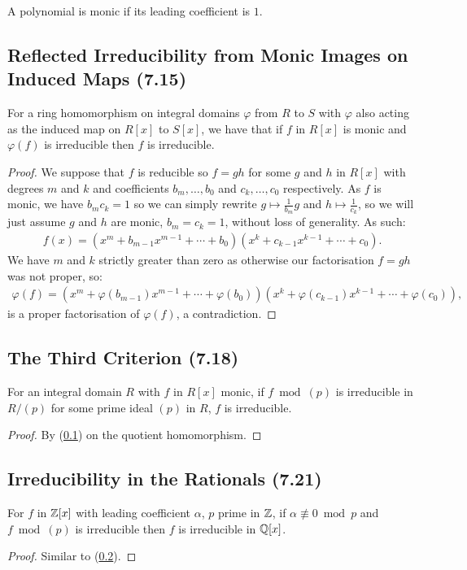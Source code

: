 A polynomial is monic if its leading coefficient is $1$.

\subsection{Reflected Irreducibility from Monic Images on Induced Maps (7.15)} \label{7.15}

For a ring homomorphism on integral domains $\varphi$ from $R$ to $S$ with $\varphi$ also
acting as the induced map on $R[x]$ to $S[x]$, we have that if $f$ in $R[x]$ is monic
and $\varphi(f)$ is irreducible then $f$ is irreducible.

\begin{proof}
    We suppose that $f$ is reducible so $f = gh$ for some $g$ and $h$ in $R[x]$ with
    degrees $m$ and $k$ and coefficients $b_m, \ldots, b_0$ and $c_k, \ldots, c_0$
    respectively. As $f$ is monic, we have $b_mc_k = 1$ so we can simply rewrite
    $g \mapsto \frac{1}{b_m}g$ and $h \mapsto \frac{1}{c_k}$, so we will just assume
    $g$ and $h$ are monic, $b_m = c_k = 1$, without loss of generality. As such:
    \begin{align*}
        f(x) = (x^m + b_{m - 1}x^{m - 1} + \cdots + b_0)
            (x^k + c_{k - 1}x^{k - 1} + \cdots + c_0).
    \end{align*} We have $m$ and $k$ strictly greater than zero as otherwise our
    factorisation $f = gh$ was not proper, so: \begin{align*}
        \varphi(f) = (x^m + \varphi(b_{m - 1})x^{m - 1} + \cdots + \varphi(b_0))
            (x^k + \varphi(c_{k - 1})x^{k - 1} + \cdots + \varphi(c_0)),
    \end{align*} is a proper factorisation of $\varphi(f)$, a contradiction.
\end{proof}

\subsection{The Third Criterion (7.18)} \label{7.18}

For an integral domain $R$ with $f$ in $R[x]$ monic, if $f \bmod (p)$
is irreducible in $R / (p)$ for some prime ideal $(p)$ in $R$, $f$ is irreducible.

\begin{proof}
    By (\ref{7.15}) on the quotient homomorphism.
\end{proof}

\subsection{Irreducibility in the Rationals (7.21)} \label{7.21}

For $f$ in $\mathbb{Z}[x]$ with leading coefficient $\alpha$, 
$p$ prime in $\mathbb{Z}$, if $\alpha \not\equiv 0 \bmod p$ and
$f \bmod (p)$ is irreducible then $f$ is irreducible in $\mathbb{Q}[x]$. 

\begin{proof}
    Similar to (\ref{7.18}).
\end{proof}
